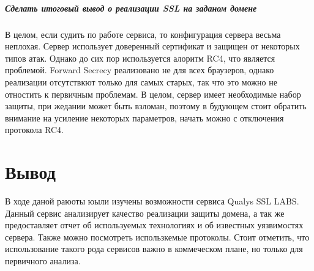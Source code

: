 \documentclass{article}
\begin{document}
\subparagraph{Сделать итоговый вывод о реализации SSL на заданом домене}

В целом, если судить по работе сервиса, то конфигурация сервера весьма неплохая. Сервер использует доверенный сертификат и защищен от некоторых типов атак. Однако до сих пор используется алоритм RC4, что является проблемой. Forward Secrecy реализовано не для всех браузеров, однако реализации отсутствкют только для самых старых, так что это можно не отностить к первичным проблемам. В целом, сервер имеет необходимые набор защиты, при жедании может быть взломан, поэтому в будующем стоит обратить внимание на усиление некоторых параметров, начать можно с отключения протокола RC4.
\section{Вывод}
В ходе даной раюоты юыли изучены возможности сервиса Qualys SSL LABS. Данный сервис анализирует качество реализации защиты домена, а так же предоставляет отчет об используемых технологиях и об известных уязвимостях сервера. Также можно посмотреть использкемые протоколы.
Стоит отметить, что использование такого рода сервисов важно в коммеческом плане, но только для первичного анализа.
\end{document}
